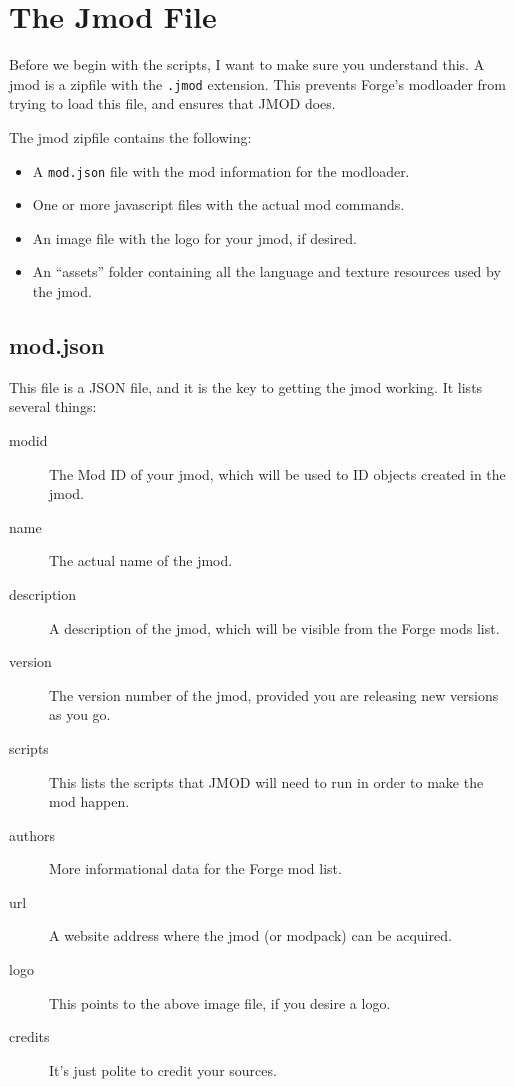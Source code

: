 \documentclass[letterpaper,titlepage,12pt]{article}
\begin{document}
\section{The Jmod File}
Before we begin with the scripts, I want to make sure you understand this.  A jmod is a zipfile with the \texttt{.jmod} extension.  This prevents Forge's modloader from trying to load this file, and ensures that JMOD does.

The jmod zipfile contains the following:

\begin{itemize}
\item A \texttt{mod.json} file with the mod information for the modloader.
\item One or more javascript files with the actual mod commands.
\item An image file with the logo for your jmod, if desired.
\item An ``assets'' folder containing all the language and texture resources used by the jmod.
\end{itemize}

\subsection{mod.json}
This file is a JSON file, and it is the key to getting the jmod working.  It lists several things:

\begin{description}
\item[modid] The Mod ID of your jmod, which will be used to ID objects created in the jmod.
\item[name] The actual name of the jmod.
\item[description] A description of the jmod, which will be visible from the Forge mods list.
\item[version] The version number of the jmod, provided you are releasing new versions as you go.
\item[scripts] This lists the scripts that JMOD will need to run in order to make the mod happen.
\item[authors] More informational data for the Forge mod list.
\item[url] A website address where the jmod (or modpack) can be acquired.
\item[logo] This points to the above image file, if you desire a logo.
\item[credits] It's just polite to credit your sources.
\end{description}
\end{document}
